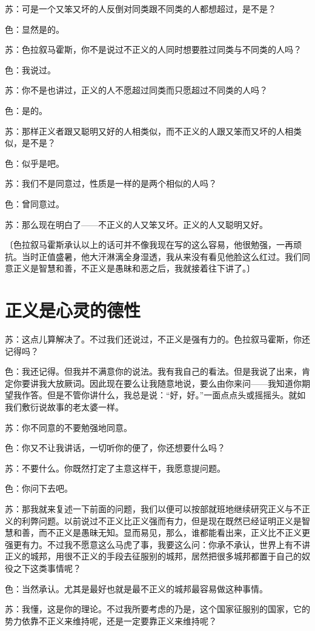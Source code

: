 \documentclass[11pt,oneside]{book}
\begin{document}
\begin{common-format}
苏：可是一个又笨又坏的人反倒对同类跟不同类的人都想超过，是不是？

色：显然是的。

苏：色拉叙马霍斯，你不是说过不正义的人同时想要胜过同类与不同类的人吗？

色：我说过。

苏：你不是也讲过，正义的人不愿超过同类而只愿超过不同类的人吗？

色：是的。

苏：那样正义者跟又聪明又好的人相类似，而不正义的人跟又笨而又坏的人相类似，是不是？

色：似乎是吧。

苏：我们不是同意过，性质是一样的是两个相似的人吗？

色：曾同意过。

苏：那么现在明白了——不正义的人又笨又坏。正义的人又聪明又好。

〔色拉叙马霍斯承认以上的话可并不像我现在写的这么容易，他很勉强，一再顽抗。当时正值盛暑，他大汗淋漓全身湿透，我从来没有看见他脸这么红过。我们同意正义是智慧和善，不正义是愚昧和恶之后，我就接着往下讲了。〕


\section{正义是心灵的德性}
苏：这点儿算解决了。不过我们还说过，不正义是强有力的。色拉叙马霍斯，你还记得吗？

色：我还记得。但我并不满意你的说法。我有我自己的看法。但是我说了出来，肯定你要讲我大放厥词。因此现在要么让我随意地说，要么由你来问——我知道你期望我作答。但是不管你讲什么，我总是说：“好，好。”一面点点头或摇摇头。就如我们敷衍说故事的老太婆一样。

苏：你不同意的不要勉强地同意。

色：你又不让我讲话，一切听你的便了，你还想要什么吗？

苏：不要什么。你既然打定了主意这样干，我愿意提问题。

色：你问下去吧。

苏：那我就来复述一下前面的问题，我们以便可以按部就班地继续研究正义与不正义的利弊问题。以前说过不正义比正义强而有力，但是现在既然已经证明正义是智慧和善，而不正义是愚昧无知。显而易见，那么，谁都能看出来，正义比不正义更强更有力。不过我不愿意这么马虎了事，我要这么问：你承不承认，世界上有不讲正义的城邦，用很不正义的手段去征服别的城邦，居然把很多城邦都置于自己的奴役之下这类事情呢？


色：当然承认。尤其是最好也就是最不正义的城邦最容易做这种事情。

苏：我懂，这是你的理论。不过我所要考虑的乃是，这个国家征服别的国家，它的势力依靠不正义来维持呢，还是一定要靠正义来维持呢？


\end{common-format}
\end{document}
